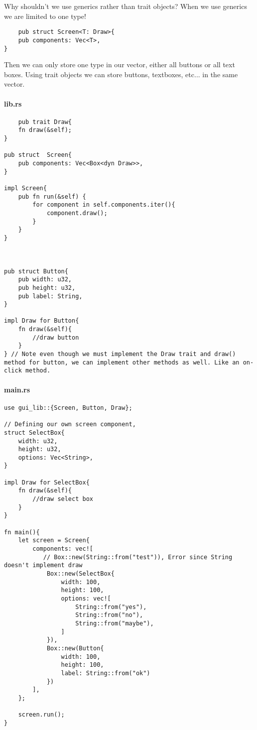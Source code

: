 Why shouldn't we use generics rather than trait objects? When we use generics we are limited to one type! \begin{lstlisting}
    pub struct Screen<T: Draw>{
    pub components: Vec<T>,
}
\end{lstlisting}

Then we can only store one type in our vector, either all buttons or all text boxes. Using trait objects we can store buttons, textboxes, etc... in the same vector.


\newpage
\paragraph*{lib.rs}\begin{lstlisting}
    pub trait Draw{
    fn draw(&self);
}

pub struct  Screen{
    pub components: Vec<Box<dyn Draw>>,
}

impl Screen{
    pub fn run(&self) {
        for component in self.components.iter(){
            component.draw();
        }
    }
}



pub struct Button{
    pub width: u32,
    pub height: u32,
    pub label: String,
}

impl Draw for Button{
    fn draw(&self){
        //draw button
    }
} // Note even though we must implement the Draw trait and draw() method for button, we can implement other methods as well. Like an on-click method.
\end{lstlisting}

\paragraph*{main.rs}\begin{lstlisting}
use gui_lib::{Screen, Button, Draw};

// Defining our own screen component,
struct SelectBox{
    width: u32,
    height: u32,
    options: Vec<String>,
}

impl Draw for SelectBox{
    fn draw(&self){
        //draw select box
    }
}

fn main(){
    let screen = Screen{
        components: vec![
           // Box::new(String::from("test")), Error since String doesn't implement draw
            Box::new(SelectBox{
                width: 100,
                height: 100,
                options: vec![
                    String::from("yes"),
                    String::from("no"),
                    String::from("maybe"),
                ]
            }),
            Box::new(Button{
                width: 100,
                height: 100,
                label: String::from("ok")
            })
        ],
    };

    screen.run();
}
\end{lstlisting}


